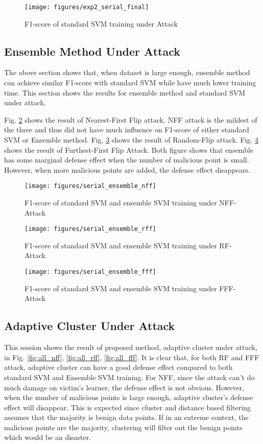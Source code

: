 \documentclass[10pt,conference,compsocconf,letterpaper]{IEEEtran}
\begin{document}
\begin{figure}[h]
  \centering
  \label{fig:exp2_serial_final}
  \texttt{[image: figures/exp2\_serial\_final]}
  \caption{F1-score of standard SVM training under Attack}
\end{figure}

\subsection{Ensemble Method Under Attack}
The above section shows that, when dataset is large enough, ensemble method can achieve similar F1-score with standard SVM while have much lower training time. This section shows the results for ensemble method and standard SVM under attack. 

Fig. \ref{fig:ensemble_nff} shows the result of Nearest-First Flip attack. NFF attack is the mildest of the three and thus did not have much influence on F1-score of either standard SVM or Ensemble method. Fig. \ref{fig:ensemble_rff} shows the result of Random-Flip attack. Fig. \ref{fig:ensemble_fff} shows the result of Furthest-First Flip Attack. Both figure shows that ensemble has some marginal defense effect when the number of malicious point is small. However, when more malicious points are added, the defense effect disappears.

\begin{figure}[h]
  \centering
  \label{fig:ensemble_nff}
  \texttt{[image: figures/serial\_ensemble\_nff]}
  \caption{F1-score of standard SVM and ensemble SVM training under NFF-Attack}
\end{figure}
\begin{figure}[h]
  \centering
  \label{fig:ensemble_rff}
  \texttt{[image: figures/serial\_ensemble\_rff]}
  \caption{F1-score of standard SVM and ensemble SVM training under RF-Attack}
\end{figure}
\begin{figure}[h]
  \centering
  \label{fig:ensemble_fff}
  \texttt{[image: figures/serial\_ensemble\_fff]}
  \caption{F1-score of standard SVM and ensemble SVM training under FFF-Attack}
\end{figure}

\subsection{Adaptive Cluster Under Attack}
This session shows the result of proposed method, adaptive cluster under attack, in Fig. \ref{fig:all_nff}, \ref{fig:all_rff}, \ref{fig:all_fff}. It is clear that, for both RF and FFF attack, adaptive cluster can have a good defense effect compared to both standard SVM and Ensemble SVM training. For NFF, since the attack can't do much damage on victim's learner, the defense effect is not obvious. However, when the number of malicious points is large enough, adaptive cluster's defense effect will disappear. This is expected since cluster and distance based filtering assumes that the majority is benign data points. If in an extreme context, the malicious points are the majority, clustering will filter out the benign points which would be an disaster. 
\end{document}

